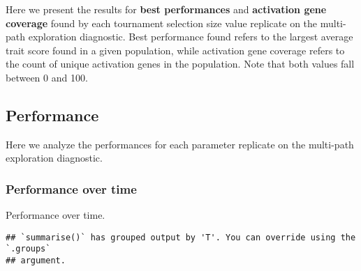\documentclass[]{book}
\newenvironment{Shaded}{\begin{snugshade}}{\end{snugshade}}
\newcommand{\DataTypeTok}[1]{\textcolor[rgb]{0.13,0.29,0.53}{#1}}
\newcommand{\KeywordTok}[1]{\textcolor[rgb]{0.13,0.29,0.53}{\textbf{#1}}}
\newcommand{\NormalTok}[1]{#1}
\newcommand{\OperatorTok}[1]{\textcolor[rgb]{0.81,0.36,0.00}{\textbf{#1}}}
\newcommand{\StringTok}[1]{\textcolor[rgb]{0.31,0.60,0.02}{#1}}
\begin{document}
Here we present the results for \textbf{best performances} and \textbf{activation gene coverage} found by each tournament selection size value replicate on the multi-path exploration diagnostic.
Best performance found refers to the largest average trait score found in a given population, while activation gene coverage refers to the count of unique activation genes in the population.
Note that both values fall between 0 and 100.

\hypertarget{performance-4}{%
\subsection{Performance}\label{performance-4}}

Here we analyze the performances for each parameter replicate on the multi-path exploration diagnostic.

\hypertarget{performance-over-time-8}{%
\subsubsection{Performance over time}\label{performance-over-time-8}}

Performance over time.

\begin{Shaded}
\end{Shaded}

\begin{verbatim}
## `summarise()` has grouped output by 'T'. You can override using the `.groups`
## argument.
\end{verbatim}
\end{document}
